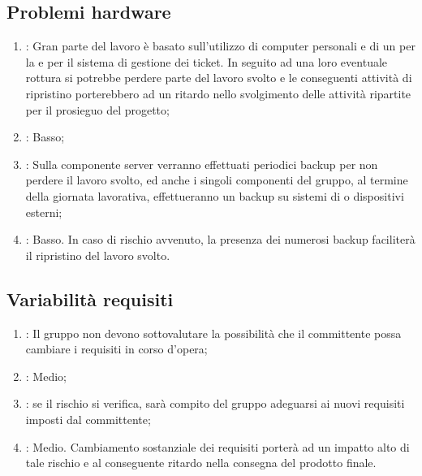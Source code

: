 \subsection{Problemi hardware}
\begin{enumerate}
\item {}: Gran parte del lavoro è basato sull'utilizzo di computer personali e di un  per la  e per il sistema di gestione dei ticket. In seguito ad una loro eventuale rottura si potrebbe perdere parte del lavoro svolto e le conseguenti attività di ripristino porterebbero ad un  ritardo nello svolgimento delle attività ripartite per il prosieguo del progetto;
\item {}: Basso;
\item {}: Sulla componente server verranno effettuati periodici backup per non perdere il lavoro svolto, ed anche i singoli componenti del gruppo, al termine della giornata lavorativa, effettueranno un backup su sistemi di  o dispositivi  esterni;
\item {}: Basso. In caso di rischio avvenuto, la presenza dei numerosi backup faciliterà il ripristino del lavoro svolto.
\end{enumerate}

\subsection{Variabilità requisiti}
\begin{enumerate}
\item {}: Il gruppo non devono sottovalutare la possibilità che il committente possa cambiare i requisiti in corso d'opera;
\item {}: Medio;
\item {}: se il rischio si verifica, sarà compito del gruppo adeguarsi ai nuovi requisiti imposti dal committente;
\item {}: Medio. Cambiamento sostanziale dei requisiti porterà ad un impatto alto di tale rischio e al conseguente ritardo nella consegna del prodotto finale.
\end{enumerate}

